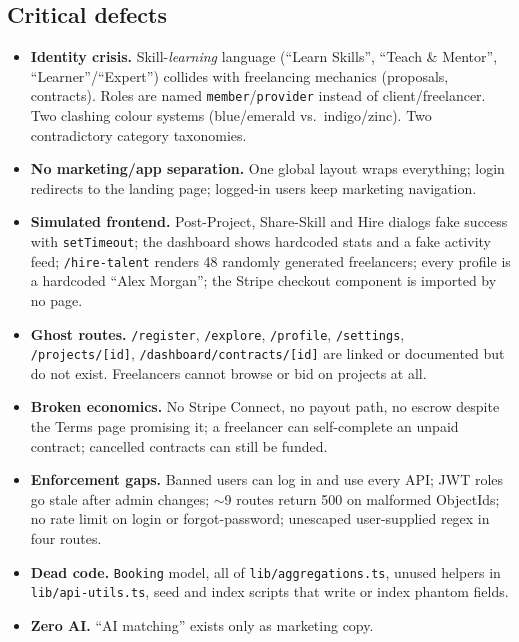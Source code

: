 \documentclass[11pt,a4paper]{article}
\newcommand{\filepath}[1]{\texttt{#1}}
\begin{document}
\subsection{Critical defects}
\begin{itemize}[leftmargin=1.6em]
  \item \textbf{Identity crisis.} Skill-\emph{learning} language (``Learn Skills'',
        ``Teach \& Mentor'', ``Learner''/``Expert'') collides with freelancing
        mechanics (proposals, contracts). Roles are named \texttt{member}/\texttt{provider}
        instead of client/freelancer. Two clashing colour systems (blue/emerald vs.\
        indigo/zinc). Two contradictory category taxonomies.
  \item \textbf{No marketing/app separation.} One global layout wraps everything;
        login redirects to the landing page; logged-in users keep marketing navigation.
  \item \textbf{Simulated frontend.} Post-Project, Share-Skill and Hire dialogs fake
        success with \texttt{setTimeout}; the dashboard shows hardcoded stats and a
        fake activity feed; \texttt{/hire-talent} renders 48 randomly generated
        freelancers; every profile is a hardcoded ``Alex Morgan''; the Stripe checkout
        component is imported by no page.
  \item \textbf{Ghost routes.} \texttt{/register}, \texttt{/explore},
        \texttt{/profile}, \texttt{/settings}, \texttt{/projects/[id]},
        \texttt{/dashboard/contracts/[id]} are linked or documented but do not exist.
        Freelancers cannot browse or bid on projects at all.
  \item \textbf{Broken economics.} No Stripe Connect, no payout path, no escrow
        despite the Terms page promising it; a freelancer can self-complete an unpaid
        contract; cancelled contracts can still be funded.
  \item \textbf{Enforcement gaps.} Banned users can log in and use every API; JWT
        roles go stale after admin changes; $\sim$9 routes return 500 on malformed
        ObjectIds; no rate limit on login or forgot-password; unescaped user-supplied
        regex in four routes.
  \item \textbf{Dead code.} \texttt{Booking} model, all of
        \filepath{lib/aggregations.ts}, unused helpers in \filepath{lib/api-utils.ts},
        seed and index scripts that write or index phantom fields.
  \item \textbf{Zero AI.} ``AI matching'' exists only as marketing copy.
\end{itemize}
\end{document}
